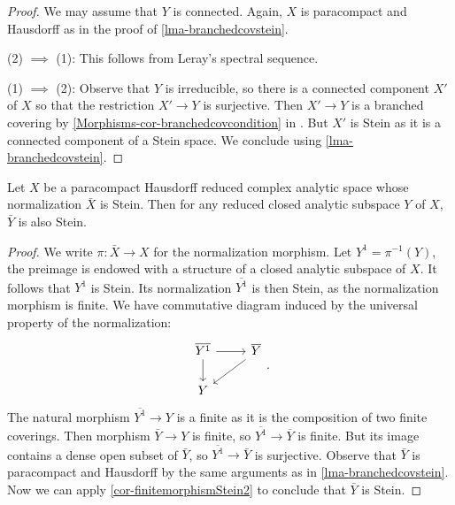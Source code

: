\begin{proof}
    We may assume that $Y$ is connected. Again, $X$ is paracompact and Hausdorff as in the proof of \cref{lma-branchedcovstein}.

    (2) $\implies$ (1): This follows from Leray's spectral sequence.

    (1) $\implies$ (2): Observe that $Y$ is irreducible, so there is a connected component $X'$ of $X$ so that the restriction $X'\rightarrow Y$ is surjective. Then $X'\rightarrow Y$ is a branched covering by \cref{Morphisms-cor-branchedcovcondition} in  . But $X'$ is Stein as it is a connected component of a Stein space. We conclude using \cref{lma-branchedcovstein}.
\end{proof}

\begin{lemma}\label{lma-normalizationsteinanalyticsubset}
    Let $X$ be a paracompact Hausdorff reduced complex analytic space whose normalization $\bar{X}$ is Stein. Then for any reduced closed analytic subspace $Y$ of $X$, $\bar{Y}$ is also Stein.
\end{lemma}
\begin{proof}
    We write $\pi:\bar{X}\rightarrow X$ for the normalization morphism. Let $Y^1=\pi^{-1}(Y)$, the preimage is endowed with a structure of a closed analytic subspace of $X$. It follows that $Y^1$ is Stein. Its normalization $\overline{Y^1}$ is then Stein, as the normalization morphism is finite. 
    We have commutative diagram induced by the universal property of the normalization:
    \[
        \begin{tikzcd}
            \overline{Y^1} \arrow[d] \arrow[r] & \overline{Y} \arrow[ld] \\
            Y                                  &                        
        \end{tikzcd}.  
    \]
    The natural morphism $\overline{Y^1}\rightarrow Y$ is a finite as it is the composition of two finite coverings. Then morphism $\bar{Y}\rightarrow Y$ is finite, so $\overline{Y^1}\rightarrow \overline{Y}$ is finite. But its image contains a dense open subset of $\bar{Y}$, so $\overline{Y^1}\rightarrow \bar{Y}$ is surjective.  
    Observe that $\bar{Y}$ is paracompact and Hausdorff by the same arguments as in \cref{lma-branchedcovstein}.
    Now we can apply \cref{cor-finitemorphismStein2} to conclude that $\bar{Y}$ is Stein.
\end{proof}


